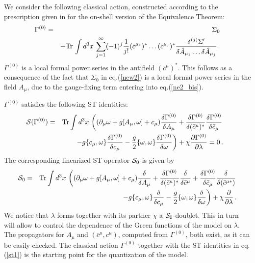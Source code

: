 \documentclass[a4paper,11pt]{article}
\def\G{\Gamma}
\begin{document}
We consider the following classical action, constructed according
to the prescription given in \cite{ET} for the on-shell version
of the Equivalence Theorem:
%
\begin{eqnarray}
\G^{(0)}  & = & \Sigma_0
                  \nonumber \\
              &   & + {\rm Tr} \, \int d^3x \, \sum_{j=1}^\infty (-1)^j 
                         \frac{1}{j!} (\bar c^{\mu_1})^* \dots (\bar c^{\mu_j})^* 
                         \frac{\delta^{(j)} \Sigma'}{\delta \hat A_{\mu_1} \dots \delta \hat A_{\mu_j}} \, .
	          \nonumber \\
\label{e11}
\end{eqnarray}
%
$\G^{(0)}$ is a local formal power series in the antifield
$({\bar c}^\mu)^*$. This follows as a consequence of the fact that 
$\Sigma_0$ in eq.(\ref{new2}) is a local formal power series in the field
$A_\mu$, due to the gauge-fixing term entering into eq.(\ref{ne2_bis}).

%
$\G^{(0)}$ satisfies the following ST identities:
%
\begin{eqnarray}
\!\!\!\!\! {\cal S}(\G^{(0)}) & = & {\rm Tr} \int d^3x \, 
\left ( 
(\partial_\mu \omega + g[A_\mu,\omega] + c_\mu)
\frac{\delta \G^{(0)}}{\delta A_\mu}
       +\frac{\delta \G^{(0)}}{\delta (\bar c^\mu)^*}\frac{\delta \G^{(0)}}{\delta {\bar c}_\mu} \right . \nonumber \\
&& \left . 
 ~~~~     
-g \{c_\mu,\omega \} \frac{\delta \G^{(0)}}{\delta c_\mu}
-\frac{g}{2} \{ \omega,\omega \} \frac{\delta \G^{(0)}}{\delta \omega}
\right ) +\chi \frac{\partial \G^{(0)}}{\partial \lambda} = 0 \, .
\label{st1}
\end{eqnarray}
%
%
The corresponding linearized ST operator ${\cal S}_0$ is given by
%
\begin{eqnarray}
{\cal S}_0 & = & {\rm Tr}
\int d^3x \, 
\left ( 
(\partial_\mu \omega + g[A_\mu,\omega] + c_\mu)
\frac{\delta }{\delta A_\mu} 
 +\frac{\delta \G^{(0)}}{\delta (\bar c^\mu)^*}\frac{\delta}{\delta\bar c^\mu}  
+ \frac{\delta \G^{(0)}}{\delta {\bar c}_\mu} \frac{\delta}{\delta(\bar c^{\mu*})}  \right . \nonumber \\
& & ~~~~~~~~~~~~~ \left . 
-g \{c_\mu,\omega \} \frac{\delta}{\delta c_\mu}
-\frac{g}{2} \{ \omega,\omega \} \frac{\delta}{\delta \omega}\right )
    +\chi \frac{\partial}{\partial \lambda} \, .
\label{linsti}
\end{eqnarray}
%
We notice that $\lambda$ forms together with its partner $\chi$ a 
${\cal S}_0$-doublet. This in turn will allow to control the dependence of the Green functions of the model on $\lambda$.
%
The propagators for $A_\mu$ and $(\bar c^\mu,c^\mu)$, computed
from $\G^{(0)}$, both exist,
as it can be easily checked.
The classical action $\G^{(0)}$ together 
with the ST identities in eq.(\ref{st1}) is the starting point for the
quantization of the model.
%
\end{document}
